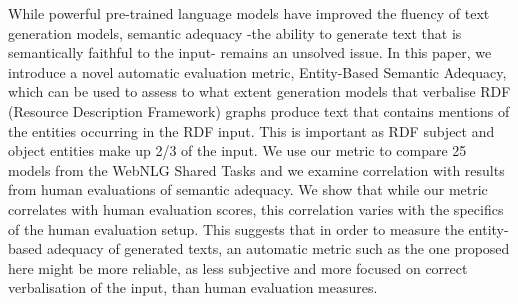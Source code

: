 While powerful pre-trained language models have improved the fluency of text generation models, semantic adequacy -the ability to generate text that is semantically faithful to the input- remains an unsolved issue. In this paper, we introduce a novel automatic evaluation metric, Entity-Based Semantic Adequacy, which can be used to assess to what extent generation models that verbalise RDF (Resource Description Framework) graphs produce text that contains mentions of the  entities occurring in the RDF input. This is important as RDF subject and object entities make up 2/3 of the input. We use our metric to compare 25 models from the WebNLG Shared Tasks and we examine correlation with results from human evaluations of semantic adequacy. We show that while our metric correlates with human evaluation scores, this correlation varies with the specifics of the human evaluation setup. This suggests that in order to measure the entity-based adequacy of generated texts, an automatic metric such as the one proposed here might be more reliable, as less subjective and more focused on correct verbalisation of the input, than human evaluation measures.
